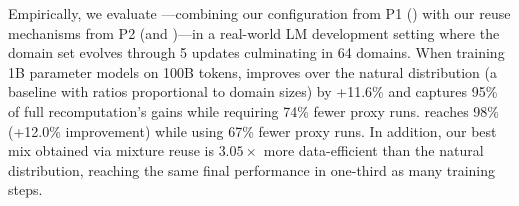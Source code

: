 Empirically, we evaluate \olmix---combining our configuration from P1 (\base) with our reuse mechanisms from P2 (\fullmixreuse and \partialmixreuse)---in a real-world LM development setting where the domain set evolves through 5 updates culminating in 64 domains.
When training 1B parameter models on 100B tokens, \fullmixreuse improves over the natural distribution (a baseline with ratios proportional to domain sizes) by +11.6\% and captures 95\% of full recomputation's gains while requiring 74\% fewer proxy runs.
\partialmixreuse reaches 98\% (+12.0\% improvement) while using 67\% fewer proxy runs.
In addition, our best mix obtained via mixture reuse is $3.05\times$ more data-efficient than the natural distribution, reaching the same final performance in one-third as many training steps.
